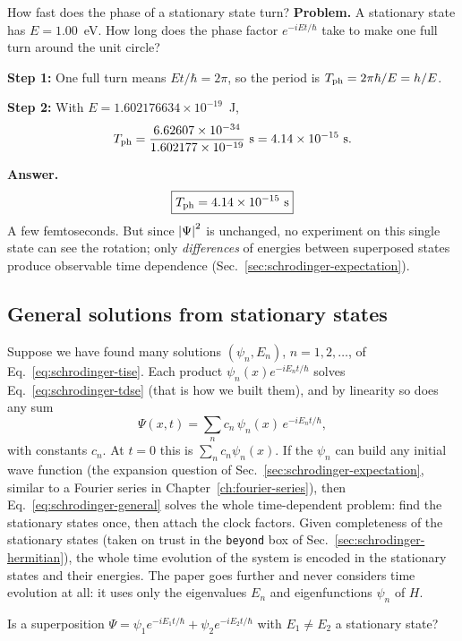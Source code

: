 \begin{sample}{How fast does the phase of a stationary state turn?}
\textbf{Problem.} A stationary state has $E=1.00$~eV. How long does the phase factor $e^{-iEt/\hbar}$ take to make one full turn around the unit circle?

\textbf{Step 1:} One full turn means $Et/\hbar=2\pi$, so the period is $T_{\rm ph}=2\pi\hbar/E=h/E$.

\textbf{Step 2:} With $E=1.602176634\times10^{-19}$~J,
\[
T_{\rm ph}=\frac{6.62607\times10^{-34}}{1.602177\times10^{-19}}~\text{s}=4.14\times10^{-15}~\text{s}.
\]

\textbf{Answer.} \[\boxed{T_{\rm ph}=4.14\times10^{-15}~\text{s}}\]
A few femtoseconds. But since $\left\lvert \Psi\right\rvert^2$ is unchanged, no experiment on this single state can see the rotation; only \emph{differences} of energies between superposed states produce observable time dependence (Sec.~\ref{sec:schrodinger-expectation}).
\end{sample}

\subsection{General solutions from stationary states}

Suppose we have found many solutions $(\psi_n,E_n)$, $n=1,2,\dots$, of Eq.~\eqref{eq:schrodinger-tise}. Each product $\psi_n(x)e^{-iE_nt/\hbar}$ solves Eq.~\eqref{eq:schrodinger-tdse} (that is how we built them), and by linearity so does any sum
\begin{equation}
\Psi(x,t)=\sum_n c_n\,\psi_n(x)\,e^{-iE_nt/\hbar},
\label{eq:schrodinger-general}
\end{equation}
with constants $c_n$. At $t=0$ this is $\sum_nc_n\psi_n(x)$. If the $\psi_n$ can build any initial wave function (the expansion question of Sec.~\ref{sec:schrodinger-expectation}, similar to a Fourier series in Chapter~\ref{ch:fourier-series}), then Eq.~\eqref{eq:schrodinger-general} solves the whole time-dependent problem: find the stationary states once, then attach the clock factors. Given completeness of the stationary states (taken on trust in the \texttt{beyond} box of Sec.~\ref{sec:schrodinger-hermitian}), the whole time evolution of the system is encoded in the stationary states and their energies. The paper goes further and never considers time evolution at all: it uses only the eigenvalues $E_n$ and eigenfunctions $\psi_n$ of $H$.

\begin{checkpoint}
Is a superposition $\Psi=\psi_1e^{-iE_1t/\hbar}+\psi_2e^{-iE_2t/\hbar}$ with $E_1\neq E_2$ a stationary state?
\end{checkpoint}


